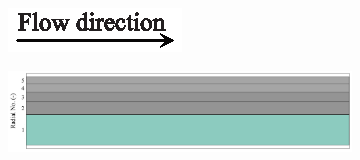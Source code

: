 \documentclass[preprint,12pt]{elsarticle}
\begin{document}
\begin{figure}
     \centering
     \begin{subfigure}[b]{\textwidth}
     	\includegraphics[width=\textwidth]{flow_dir.eps}
     \end{subfigure}
     \begin{subfigure}[b]{0.85\textwidth}
\includegraphics[width=\textwidth]{results/segments/5segEq/80C20T/seg.png}
     \end{subfigure}
     \hfill
     \begin{subfigure}[b]{0.1\textwidth}

\end{subfigure}
\end{figure}
\end{document}
